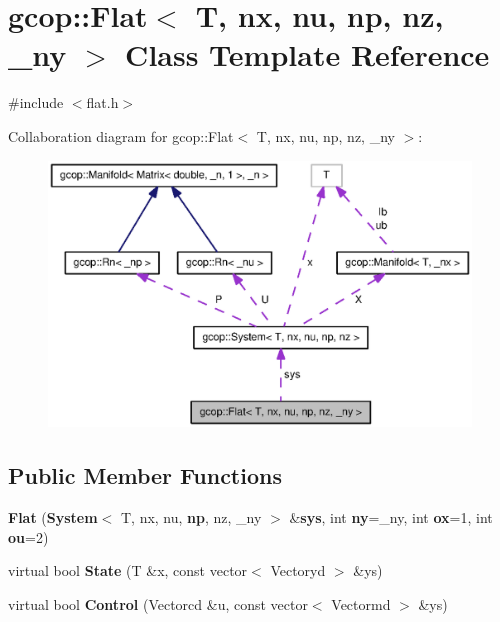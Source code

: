 \section{gcop\-:\-:\-Flat$<$ \-T, nx, nu, np, nz, \-\_\-ny $>$ \-Class \-Template \-Reference}
\label{classgcop_1_1Flat}


{\ttfamily \#include $<$flat.\-h$>$}



\-Collaboration diagram for gcop\-:\-:\-Flat$<$ \-T, nx, nu, np, nz, \-\_\-ny $>$\-:\nopagebreak
\begin{figure}[H]
\begin{center}
\leavevmode
\includegraphics[width=350pt]{classgcop_1_1Flat__coll__graph}
\end{center}
\end{figure}
\subsection*{\-Public \-Member \-Functions}
\begin{DoxyCompactItemize}
\item 
{\bf \-Flat} ({\bf \-System}$<$ \-T, nx, nu, {\bf np}, nz, \-\_\-ny $>$ \&{\bf sys}, int {\bf ny}=\-\_\-ny, int {\bf ox}=1, int {\bf ou}=2)
\item 
virtual bool {\bf \-State} (\-T \&x, const vector$<$ \-Vectoryd $>$ \&ys)
\item 
virtual bool {\bf \-Control} (\-Vectorcd \&u, const vector$<$ \-Vectormd $>$ \&ys)
\end{DoxyCompactItemize}
